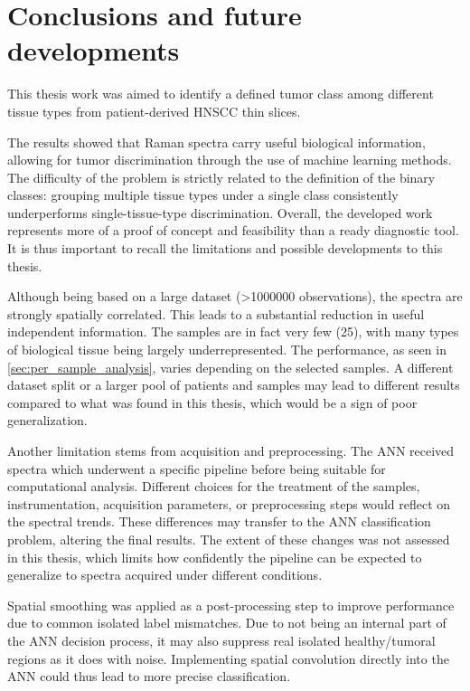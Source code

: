 \chapter{Conclusions and future developments}
\label{ch:conclusions}

This thesis work was aimed to identify a defined tumor class among different tissue types from patient-derived HNSCC thin slices.

The results showed that Raman spectra carry useful biological information, allowing for tumor discrimination through the use of machine learning methods. The difficulty of the problem is strictly related to the definition of the binary classes: grouping multiple tissue types under a single class consistently underperforms single-tissue-type discrimination. Overall, the developed work represents more of a proof of concept and feasibility than a ready diagnostic tool. It is thus important to recall the limitations and possible developments to this thesis.

Although being based on a large dataset (>1000000 observations), the spectra are strongly spatially correlated. This leads to a substantial reduction in useful independent information. The samples are in fact very few (25), with many types of biological tissue being largely underrepresented. The performance, as seen in \cref{sec:per_sample_analysis}, varies depending on the selected samples. A different dataset split or a larger pool of patients and samples may lead to different results compared to what was found in this thesis, which would be a sign of poor generalization.

Another limitation stems from acquisition and preprocessing. The ANN received spectra which underwent a specific pipeline before being suitable for computational analysis. Different choices for the treatment of the samples, instrumentation, acquisition parameters, or preprocessing steps would reflect on the spectral trends. These differences may transfer to the ANN classification problem, altering the final results. The extent of these changes was not assessed in this thesis, which limits how confidently the pipeline can be expected to generalize to spectra acquired under different conditions.

Spatial smoothing was applied as a post-processing step to improve performance due to common isolated label mismatches. Due to not being an internal part of the ANN decision process, it may also suppress real isolated healthy/tumoral regions as it does with noise. Implementing spatial convolution directly into the ANN could thus lead to more precise classification.

